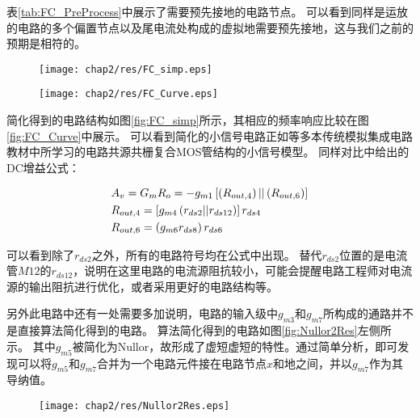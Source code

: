 表\ref{tab:FC_PreProcess}中展示了需要预先接地的电路节点。
可以看到同样是运放的电路的多个偏置节点以及尾电流处构成的虚拟地需要预先接地，这与我们之前的预期是相符的。

\begin{figure}[!htp]
	\centering
	\texttt{[image: chap2/res/FC\_simp.eps]}
\end{figure}

\begin{figure}[!htp]
	\centering
	\texttt{[image: chap2/res/FC\_Curve.eps]}
\end{figure}

简化得到的电路结构如图\ref{fig:FC_simp}所示，其相应的频率响应比较在图\ref{fig:FC_Curve}中展示。
可以看到简化的小信号电路正如\parencite{GRAY-Analog,Allen-Analog}等多本传统模拟集成电路教材中所学习的电路共源共栅复合MOS管结构的小信号模型。
同样对比\parencite{GRAY-Analog}中给出的DC增益公式：

\begin{equation}
\begin{gathered}
{A_v} = {G_m}{R_o} =  - {g_{m1}}\left[ {\left( {{R_{out,4}}} \right)||\left( {{R_{out,6}}} \right)} \right] \hfill \\
{R_{out,4}} = \left[ {{g_{m4}}\left( {{r_{ds2}}||{r_{ds12}}} \right)} \right]{r_{ds4}} \hfill \\
{R_{out,6}} = \left( {{g_{m6}}{r_{ds8}}} \right){r_{ds6}} \hfill \\ 
\end{gathered}
\end{equation}

可以看到除了$r_{ds2}$之外，所有的电路符号均在公式中出现。
替代$r_{ds2}$位置的是电流管$M12$的$r_{ds12}$，说明在这里电路的电流源阻抗较小，可能会提醒电路工程师对电流源的输出阻抗进行优化，或者采用更好的电路结构等。

另外此电路中还有一处需要多加说明，电路的输入级中$g_{m3}$和$g_{m7}$所构成的通路并不是直接算法简化得到的电路。
算法简化得到的电路如图\ref{fig:Nullor2Res}左侧所示。
其中$g_{m5}$被简化为Nullor，故形成了虚短虚短的特性。通过简单分析，即可发现可以将$g_{m5}$和$g_{m7}$合并为一个电路元件接在电路节点$x$和地之间，并以$g_{m7}$作为其导纳值。

\begin{figure}[!htp]
	\centering
	\texttt{[image: chap2/res/Nullor2Res.eps]}
\end{figure}

